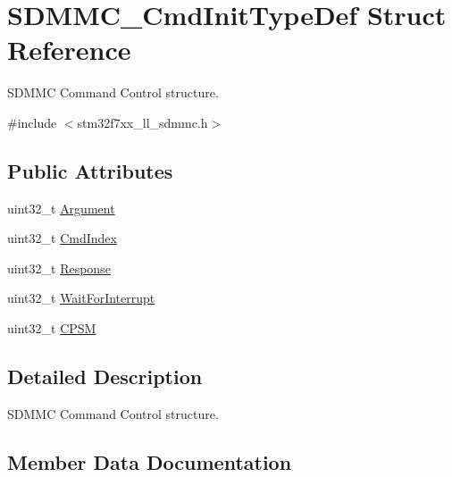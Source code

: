 \hypertarget{struct_s_d_m_m_c___cmd_init_type_def}{}\section{S\+D\+M\+M\+C\+\_\+\+Cmd\+Init\+Type\+Def Struct Reference}
\label{struct_s_d_m_m_c___cmd_init_type_def}


S\+D\+M\+MC Command Control structure.  




{\ttfamily \#include $<$stm32f7xx\+\_\+ll\+\_\+sdmmc.\+h$>$}

\subsection*{Public Attributes}
\begin{DoxyCompactItemize}
\item 
uint32\+\_\+t \mbox{\hyperlink{struct_s_d_m_m_c___cmd_init_type_def_aa427e5ad70465e03b0d5b591efa3c598}{Argument}}
\item 
uint32\+\_\+t \mbox{\hyperlink{struct_s_d_m_m_c___cmd_init_type_def_a644b96b2db05401103e4845fcf6be89e}{Cmd\+Index}}
\item 
uint32\+\_\+t \mbox{\hyperlink{struct_s_d_m_m_c___cmd_init_type_def_aee8e8e417ecc5aa3ef8c3926d3521fb6}{Response}}
\item 
uint32\+\_\+t \mbox{\hyperlink{struct_s_d_m_m_c___cmd_init_type_def_abffa8b5e053b202adf3fae688b78f2af}{Wait\+For\+Interrupt}}
\item 
uint32\+\_\+t \mbox{\hyperlink{struct_s_d_m_m_c___cmd_init_type_def_a0dfe4dc8a7f873c0e878a2ed12d1df54}{C\+P\+SM}}
\end{DoxyCompactItemize}


\subsection{Detailed Description}
S\+D\+M\+MC Command Control structure. 

\subsection{Member Data Documentation}
\mbox{\label{struct_s_d_m_m_c___cmd_init_type_def_aa427e5ad70465e03b0d5b591efa3c598}} 
